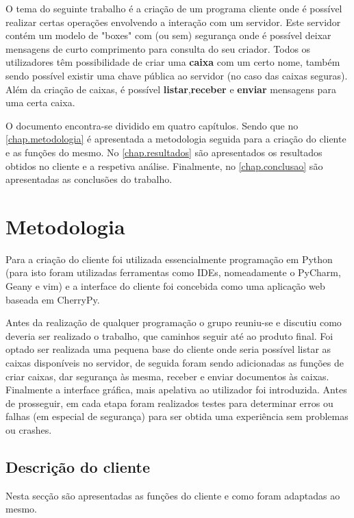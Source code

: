 \documentclass{report}
\begin{document}
O tema do seguinte trabalho é a criação de um programa cliente onde é possível realizar certas operações envolvendo a interação com um servidor.
Este servidor contém um modelo de "boxes" com (ou sem) segurança onde é possível deixar mensagens de curto comprimento para consulta do seu criador. Todos os utilizadores têm possibilidade de criar uma \textbf{caixa} com um certo nome, também sendo possível existir uma chave pública ao servidor (no caso das caixas seguras). Além da criação de caixas, é possível \textbf{listar},\textbf{receber} e \textbf{enviar} mensagens para uma certa caixa.

O documento encontra-se dividido em quatro capítulos.
Sendo que no \autoref{chap.metodologia} é apresentada a metodologia seguida para a criação do cliente e
as funções do mesmo.
No \autoref{chap.resultados} são apresentados os resultados obtidos no cliente e a respetiva análise.
Finalmente, no \autoref{chap.conclusao} são apresentadas
as conclusões do trabalho.

\chapter{Metodologia}
\label{chap.metodologia}

Para a criação do cliente foi utilizada essencialmente programação em Python (para isto foram utilizadas ferramentas como IDEs, nomeadamente o PyCharm, Geany e vim) e a interface do cliente foi concebida como uma aplicação web baseada em CherryPy.

Antes da realização de qualquer programação o grupo reuniu-se e discutiu como deveria ser realizado o trabalho, que caminhos seguir até ao produto final. Foi optado ser realizada uma pequena base do cliente onde seria possível listar as caixas disponíveis no servidor, de seguida foram sendo adicionadas as funções de criar caixas, dar segurança às mesma, receber e enviar documentos às caixas. Finalmente a interface gráfica, mais apelativa ao utilizador foi introduzida. Antes de prosseguir, em cada etapa foram realizados testes para determinar erros ou falhas (em especial de segurança) para ser obtida uma experiência sem problemas ou crashes. 

\section{Descrição do cliente}
\label{subs.desc}
Nesta secção são apresentadas as funções do cliente e como foram adaptadas ao mesmo.
\end{document}
